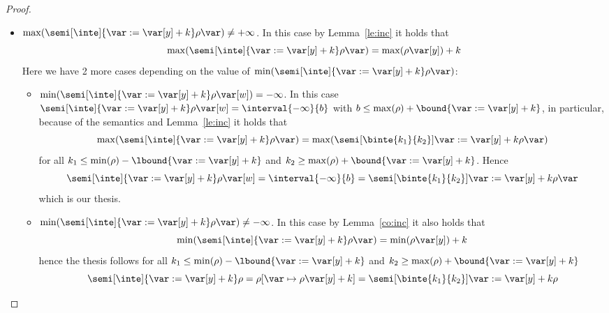 \begin{proof}
\begin{itemize}
\begin{itemize}
    \end{itemize}
  \item
    \({\max(\semi[\inte]{\var := \var[y] + k}\rho\var)} \neq
    +\infty\). In this case by Lemma~\ref{le:inc} it holds that
    \begin{equation*}
      \max(\semi[\inte]{\var:= \var[y] + k}\rho\var) = \max(\rho\var[y]) + k
    \end{equation*}
    Here we have 2 more cases depending on the value of
    \(\min(\semi[\inte]{\var:= \var[y] + k}\rho\var)\):
    \begin{itemize}
    \item
      \({\min(\semi[\inte]{\var:= \var[y] + k}\rho\var[w])} =
      -\infty\). In this case
      \(\semi[\inte]{\var := \var[y] + k}\rho\var[w] =
      \interval{-\infty}{b}\) with
      \(b \leq \max(\rho) + \bound{\var := \var[y] + k}\), in
      particular, because of the semantics and Lemma~\ref{le:inc} it
      holds that
      \begin{equation*}
        \max(\semi[\inte]{\var := \var[y] + k}\rho\var) = \max(\semi[\binte{k_1}{k_2}]{\var := \var[y] + k}\rho\var)
      \end{equation*}
      for all \(k_1 \leq \min(\rho) - \lbound{\var := \var[y] + k}\)
      and \(k_2 \geq \max(\rho) + \bound{\var := \var[y] + k}\). Hence
      \begin{equation*}
        \semi[\inte]{\var := \var[y] + k}\rho\var[w] = \interval{-\infty}{b} = \semi[\binte{k_1}{k_2}]{\var:=\var[y]+k}\rho\var
      \end{equation*}
      which is our thesis.
      
    \item
      \({\min(\semi[\inte]{\var:= \var[y] + k}\rho\var)} \neq
      -\infty\). In this case by Lemma~\ref{co:inc} it also holds that
      \begin{equation*}
        \min(\semi[\inte]{\var := \var[y] + k}\rho\var) = \min(\rho\var[y]) + k
      \end{equation*}
      hence the thesis follows for all
      \(k_1 \leq \min(\rho) - \lbound{\var := \var[y] + k}\) and
      \(k_2 \geq \max(\rho) + \bound{\var := \var[y] + k}\)
      \begin{equation*}
        \semi[\inte]{\var := \var[y] + k}\rho = \rho[\var \mapsto \rho\var[y] + k] = \semi[\binte{k_1}{k_2}]{\var := \var[y] + k}\rho
      \end{equation*}
    \end{itemize}
  \end{itemize}
  

\end{proof}
